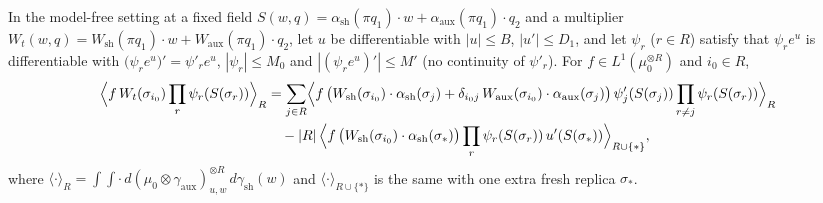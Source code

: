 \begin{theorem}\label{thm:sg-tal:perceptron-tilted-stein}
  \leanok
In the model-free setting at a fixed field $S(w,q)=\alpha_{\mathrm{sh}}(\pi q_1)\cdot w+\alpha_{\mathrm{aux}}(\pi q_1)\cdot q_2$ and a multiplier $W_t(w,q)=W_{\mathrm{sh}}(\pi q_1)\cdot w+W_{\mathrm{aux}}(\pi q_1)\cdot q_2$, let
$u$ be differentiable with $|u|\le B$, $|u'|\le D_1$, and let $\psi_r$ ($r\in R$) satisfy that $\psi_r e^{u}$ is differentiable with
$\bigl(\psi_re^{u}\bigr)'=\psi'_r e^{u}$, $|\psi_r|\le M_0$ and $|(\psi_re^u)'|\le M'$ (no continuity of $\psi'_r$). For $f\in L^1(\mu_0^{\otimes R})$ and $i_0\in R$,
\begin{align*}
 \Bigl\langle f\,W_t(\sigma_{i_0})\prod_{r}\psi_r(S(\sigma_r))\Bigr\rangle_R
 &=\sum_{j\in R}\Bigl\langle f\,\bigl(W_{\mathrm{sh}}(\sigma_{i_0})\cdot\alpha_{\mathrm{sh}}(\sigma_j)+\delta_{i_0j}\,W_{\mathrm{aux}}(\sigma_{i_0})\cdot\alpha_{\mathrm{aux}}(\sigma_j)\bigr)\,\psi'_j(S(\sigma_j))\prod_{r\ne j}\psi_r(S(\sigma_r))\Bigr\rangle_R\\
 &\quad-|R|\,\Bigl\langle f\,\bigl(W_{\mathrm{sh}}(\sigma_{i_0})\cdot\alpha_{\mathrm{sh}}(\sigma_*)\bigr)\prod_{r}\psi_r(S(\sigma_r))\,u'(S(\sigma_*))\Bigr\rangle_{R\cup\{*\}},
\end{align*}
where $\langle\cdot\rangle_R=\int\!\int\cdot\,d(\mu_0\otimes\gamma_{\mathrm{aux}})_{u,w}^{\otimes R}\,d\gamma_{\mathrm{sh}}(w)$ and $\langle\cdot\rangle_{R\cup\{*\}}$ is the same with one extra fresh replica $\sigma_*$.
\end{theorem}
